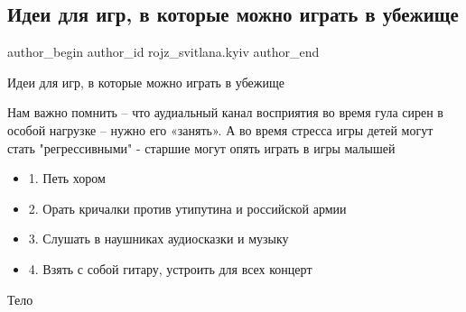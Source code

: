  
 
 
 
 
 
\subsection{Идеи для игр, в которые можно играть в убежище}
\label{sec:26_02_2022.fb.rojz_svitlana.kyiv.1.igry}
 
\ifcmt
 author_begin
   author_id rojz_svitlana.kyiv
 author_end
\fi

Идеи для игр, в которые можно играть в убежище

Нам важно помнить – что аудиальный канал восприятия во время гула сирен в
особой нагрузке – нужно его «занять». А во время стресса игры детей могут стать
"регрессивными" - старшие могут опять играть в игры малышей

\begin{itemize}
  \item 1. Петь хором
  \item 2. Орать кричалки против утипутина и российской армии
  \item 3. Слушать в наушниках аудиосказки и музыку
  \item 4. Взять с собой гитару, устроить для всех концерт
\end{itemize}


 Тело

